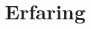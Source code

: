 \documentclass[a4paper]{twentysecondcv} %
\begin{document}





\vfill
\section{Erfaring}
\end{document}
